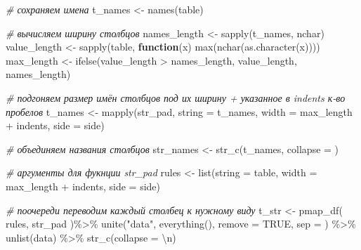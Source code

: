 \documentclass[
]{book}
\newenvironment{Shaded}{\begin{snugshade}}{\end{snugshade}}
\newcommand{\AttributeTok}[1]{\textcolor[rgb]{0.77,0.63,0.00}{#1}}
\newcommand{\CommentTok}[1]{\textcolor[rgb]{0.56,0.35,0.01}{\textit{#1}}}
\newcommand{\ConstantTok}[1]{\textcolor[rgb]{0.00,0.00,0.00}{#1}}
\newcommand{\ControlFlowTok}[1]{\textcolor[rgb]{0.13,0.29,0.53}{\textbf{#1}}}
\newcommand{\FunctionTok}[1]{\textcolor[rgb]{0.00,0.00,0.00}{#1}}
\newcommand{\NormalTok}[1]{#1}
\newcommand{\OtherTok}[1]{\textcolor[rgb]{0.56,0.35,0.01}{#1}}
\newcommand{\SpecialCharTok}[1]{\textcolor[rgb]{0.00,0.00,0.00}{#1}}
\newcommand{\StringTok}[1]{\textcolor[rgb]{0.31,0.60,0.02}{#1}}
\begin{document}
\begin{Shaded}
\begin{Highlighting}[]
  \CommentTok{\# сохраняем имена}
\NormalTok{  t\_names      }\OtherTok{\textless{}{-}} \FunctionTok{names}\NormalTok{(table)}

  \CommentTok{\# вычисляем ширину столбцов}
\NormalTok{  names\_length }\OtherTok{\textless{}{-}} \FunctionTok{sapply}\NormalTok{(t\_names, nchar) }
\NormalTok{  value\_length }\OtherTok{\textless{}{-}} \FunctionTok{sapply}\NormalTok{(table, }\ControlFlowTok{function}\NormalTok{(x) }\FunctionTok{max}\NormalTok{(}\FunctionTok{nchar}\NormalTok{(}\FunctionTok{as.character}\NormalTok{(x))))}
\NormalTok{  max\_length   }\OtherTok{\textless{}{-}} \FunctionTok{ifelse}\NormalTok{(value\_length }\SpecialCharTok{\textgreater{}}\NormalTok{ names\_length, value\_length, names\_length)}
  
  \CommentTok{\# подгоняем размер имён столбцов под их ширину + указанное в indents к{-}во пробелов }
\NormalTok{  t\_names }\OtherTok{\textless{}{-}} \FunctionTok{mapply}\NormalTok{(str\_pad, }
                    \AttributeTok{string =}\NormalTok{ t\_names, }
                    \AttributeTok{width  =}\NormalTok{ max\_length }\SpecialCharTok{+}\NormalTok{ indents, }
                    \AttributeTok{side   =}\NormalTok{ side)}
  
  \CommentTok{\# объединяем названия столбцов}
\NormalTok{  str\_names }\OtherTok{\textless{}{-}} \FunctionTok{str\_c}\NormalTok{(t\_names, }\AttributeTok{collapse =} \StringTok{\textquotesingle{}\textquotesingle{}}\NormalTok{)}
  
  \CommentTok{\# аргументы для фукнции str\_pad}
\NormalTok{  rules }\OtherTok{\textless{}{-}} \FunctionTok{list}\NormalTok{(}\AttributeTok{string =}\NormalTok{ table, }\AttributeTok{width =}\NormalTok{ max\_length }\SpecialCharTok{+}\NormalTok{ indents, }\AttributeTok{side =}\NormalTok{ side)}

  \CommentTok{\# поочереди переводим каждый столбец к нужному виду}
\NormalTok{  t\_str }\OtherTok{\textless{}{-}}   \FunctionTok{pmap\_df}\NormalTok{( rules, str\_pad )}\SpecialCharTok{\%\textgreater{}\%}
              \FunctionTok{unite}\NormalTok{(}\StringTok{"data"}\NormalTok{, }\FunctionTok{everything}\NormalTok{(), }\AttributeTok{remove =} \ConstantTok{TRUE}\NormalTok{, }\AttributeTok{sep =} \StringTok{\textquotesingle{}\textquotesingle{}}\NormalTok{) }\SpecialCharTok{\%\textgreater{}\%}
              \FunctionTok{unlist}\NormalTok{(data) }\SpecialCharTok{\%\textgreater{}\%}
              \FunctionTok{str\_c}\NormalTok{(}\AttributeTok{collapse =} \StringTok{\textquotesingle{}}\SpecialCharTok{\textbackslash{}n}\StringTok{\textquotesingle{}}\NormalTok{) }
  

\end{Highlighting}
\end{Shaded}
\end{document}
